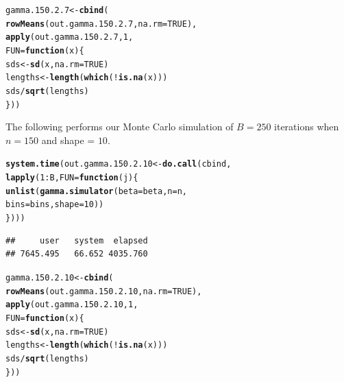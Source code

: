 \documentclass[11pt]{article}\usepackage[]{graphicx}\usepackage[]{color}
\makeatletter
\newcommand{\hlnum}[1]{\textcolor[rgb]{0.686,0.059,0.569}{#1}}%
\newcommand{\hlopt}[1]{\textcolor[rgb]{0,0,0}{#1}}%
\newcommand{\hlstd}[1]{\textcolor[rgb]{0.345,0.345,0.345}{#1}}%
\newcommand{\hlkwa}[1]{\textcolor[rgb]{0.161,0.373,0.58}{\textbf{#1}}}%
\newcommand{\hlkwb}[1]{\textcolor[rgb]{0.69,0.353,0.396}{#1}}%
\newcommand{\hlkwc}[1]{\textcolor[rgb]{0.333,0.667,0.333}{#1}}%
\newcommand{\hlkwd}[1]{\textcolor[rgb]{0.737,0.353,0.396}{\textbf{#1}}}%
\newenvironment{kframe}{%
 \def\at@end@of@kframe{}%
 \ifinner\ifhmode%
  \def\at@end@of@kframe{\end{minipage}}%
  \begin{minipage}{\columnwidth}%
 \fi\fi%
 \def\FrameCommand##1{\hskip\@totalleftmargin \hskip-\fboxsep
 \colorbox{shadecolor}{##1}\hskip-\fboxsep
     \hskip-\linewidth \hskip-\@totalleftmargin \hskip\columnwidth}%
 \MakeFramed {\advance\hsize-\width
   \@totalleftmargin\z@ \linewidth\hsize
   \@setminipage}}%
 {\par\unskip\endMakeFramed%
 \at@end@of@kframe}
\newenvironment{knitrout}{}{} %
\makeatother
\begin{document}
\begin{knitrout}
\color{fgcolor}\begin{kframe}
\begin{alltt}
\hlstd{gamma.150.2.7} \hlkwb{<-} \hlkwd{cbind}\hlstd{(}
  \hlkwd{rowMeans}\hlstd{(out.gamma.150.2.7,} \hlkwc{na.rm} \hlstd{=} \hlnum{TRUE}\hlstd{),}
  \hlkwd{apply}\hlstd{(out.gamma.150.2.7,} \hlnum{1}\hlstd{,}
  \hlkwc{FUN} \hlstd{=} \hlkwa{function}\hlstd{(}\hlkwc{x}\hlstd{)\{}
    \hlstd{sds} \hlkwb{<-} \hlkwd{sd}\hlstd{(x,} \hlkwc{na.rm} \hlstd{=} \hlnum{TRUE}\hlstd{)}
    \hlstd{lengths} \hlkwb{<-} \hlkwd{length}\hlstd{(}\hlkwd{which}\hlstd{(}\hlopt{!}\hlkwd{is.na}\hlstd{(x)))}
    \hlstd{sds} \hlopt{/} \hlkwd{sqrt}\hlstd{(lengths)}
  \hlstd{\}))}
\end{alltt}
\end{kframe}
\end{knitrout}

The following performs our Monte Carlo simulation of $B = 250$ iterations 
when $n = 150$ and shape = $10$.

\begin{knitrout}
\color{fgcolor}\begin{kframe}
\begin{alltt}
\hlkwd{system.time}\hlstd{(out.gamma.150.2.10} \hlkwb{<-} \hlkwd{do.call}\hlstd{(cbind,}
  \hlkwd{lapply}\hlstd{(}\hlnum{1}\hlopt{:}\hlstd{B,} \hlkwc{FUN} \hlstd{=} \hlkwa{function}\hlstd{(}\hlkwc{j}\hlstd{)\{}
    \hlkwd{unlist}\hlstd{(}\hlkwd{gamma.simulator}\hlstd{(}\hlkwc{beta} \hlstd{= beta,} \hlkwc{n} \hlstd{= n,}
      \hlkwc{bins} \hlstd{= bins,} \hlkwc{shape} \hlstd{=} \hlnum{10}\hlstd{))}
\hlstd{\})))}
\end{alltt}
\begin{verbatim}
##     user   system  elapsed 
## 7645.495   66.652 4035.760
\end{verbatim}
\end{kframe}
\end{knitrout}

\begin{knitrout}
\color{fgcolor}\begin{kframe}
\begin{alltt}
\hlstd{gamma.150.2.10} \hlkwb{<-} \hlkwd{cbind}\hlstd{(}
  \hlkwd{rowMeans}\hlstd{(out.gamma.150.2.10,} \hlkwc{na.rm} \hlstd{=} \hlnum{TRUE}\hlstd{),}
  \hlkwd{apply}\hlstd{(out.gamma.150.2.10,} \hlnum{1}\hlstd{,}
  \hlkwc{FUN} \hlstd{=} \hlkwa{function}\hlstd{(}\hlkwc{x}\hlstd{)\{}
    \hlstd{sds} \hlkwb{<-} \hlkwd{sd}\hlstd{(x,} \hlkwc{na.rm} \hlstd{=} \hlnum{TRUE}\hlstd{)}
    \hlstd{lengths} \hlkwb{<-} \hlkwd{length}\hlstd{(}\hlkwd{which}\hlstd{(}\hlopt{!}\hlkwd{is.na}\hlstd{(x)))}
    \hlstd{sds} \hlopt{/} \hlkwd{sqrt}\hlstd{(lengths)}
  \hlstd{\}))}
\end{alltt}
\end{kframe}
\end{knitrout}
\end{document}
